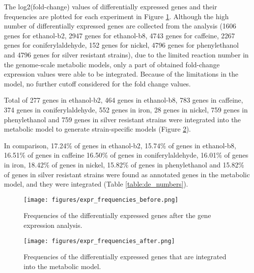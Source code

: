The log2(fold-change) values of differentially expressed genes and their frequencies are plotted for each experiment in Figure \ref{fig:expr_frequencies_before}. Although the high number of differentially expressed genes are collected from the analysis (1606 genes for ethanol-b2, 2947 genes for ethanol-b8, 4743 genes for caffeine, 2267 genes for coniferylaldehyde, 152 genes for nickel, 4796 genes for phenylethanol and 4796 genes for silver resistant strains), due to the limited reaction number in the genome-scale metabolic models, only a part of obtained fold-change expression values were able to be integrated. Because of the limitations in the model, no further cutoff considered for the fold change values.

Total of 277 genes in ethanol-b2, 464 genes in ethanol-b8, 783 genes in caffeine, 374 genes in coniferylaldehyde, 552 genes in iron, 28 genes in nickel, 759 genes in phenylethanol and 759 genes in silver resistant strains were integrated into the metabolic model to generate strain-specific models (Figure \ref{fig:expr_frequencies_after}).



In comparison, 17.24\% of genes in ethanol-b2, 15.74\% of genes in ethanol-b8, 16.51\% of genes in caffeine	16.50\% of genes in coniferylaldehyde, 16.01\% of genes in iron, 18.42\% of genes	in nickel, 15.82\% of genes in phenylethanol and 15.82\%  of genes in silver resistant strains were found as annotated genes in the metabolic model, and they were integrated (Table \ref{table:de_numbers}).

\begin{figure}[H]
  \begin{center}
  \texttt{[image: figures/expr\_frequencies\_before.png]}
  \caption[Frequencies of the differentially expressed genes after the gene expression analysis]{Frequencies of the differentially expressed genes after the gene expression analysis.}
  \label{fig:expr_frequencies_before}
  \end{center}
\end{figure}

\begin{figure}[H]
  \begin{center}
  \texttt{[image: figures/expr\_frequencies\_after.png]}
  \caption[Frequencies of the differentially expressed genes that are integrated into the metabolic model]{Frequencies of the differentially expressed genes that are integrated into the metabolic model.}
  \label{fig:expr_frequencies_after}
  \end{center}
\end{figure}

